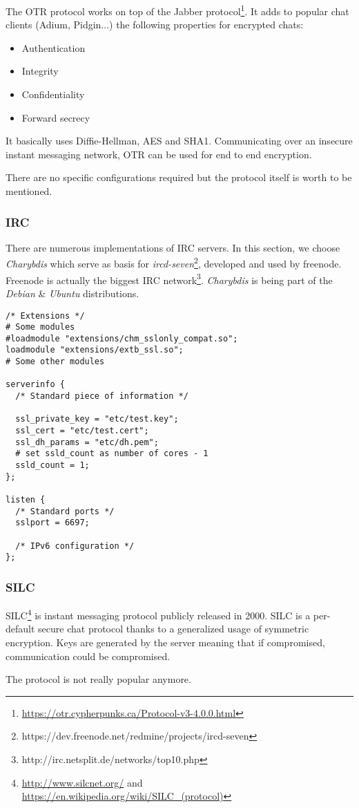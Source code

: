 The OTR protocol works on top of the Jabber protocol\footnote{\url{https://otr.cypherpunks.ca/Protocol-v3-4.0.0.html}}.  
It adds to popular chat clients (Adium, Pidgin...) the following properties for encrypted chats:
\begin{itemize}
    \item Authentication
    \item Integrity
    \item Confidentiality
    \item Forward secrecy
\end{itemize}

It basically uses Diffie-Hellman, AES and SHA1. Communicating over an insecure instant messaging network, OTR can be used for end to end encryption.

There are no specific configurations required but the protocol itself is worth to be mentioned.

\subsubsection{IRC}


There are numerous implementations of IRC servers.  In this section, we choose {\it Charybdis} which serve as basis for {\it ircd-seven}\footnote{https://dev.freenode.net/redmine/projects/ircd-seven}, developed and used by freenode. Freenode is actually the biggest IRC network\footnote{http://irc.netsplit.de/networks/top10.php}.  {\it Charybdis} is being part of the {\it Debian} \& {\it Ubuntu} distributions.

\begin{lstlisting}
/* Extensions */
# Some modules 
#loadmodule "extensions/chm_sslonly_compat.so";
loadmodule "extensions/extb_ssl.so";
# Some other modules

serverinfo {
  /* Standard piece of information */
  
  ssl_private_key = "etc/test.key";
  ssl_cert = "etc/test.cert";
  ssl_dh_params = "etc/dh.pem";
  # set ssld_count as number of cores - 1
  ssld_count = 1; 
};

listen {
  /* Standard ports */
  sslport = 6697;

  /* IPv6 configuration */
};
\end{lstlisting}


\subsubsection{SILC}

SILC\footnote{\url{http://www.silcnet.org/} and
\url{https://en.wikipedia.org/wiki/SILC_(protocol)}} is instant messaging
protocol publicly released in 2000. SILC is a per-default secure chat protocol
thanks to a generalized usage of symmetric encryption. Keys are generated by
the server meaning that if compromised, communication could be compromised.

The protocol is not really popular anymore.





